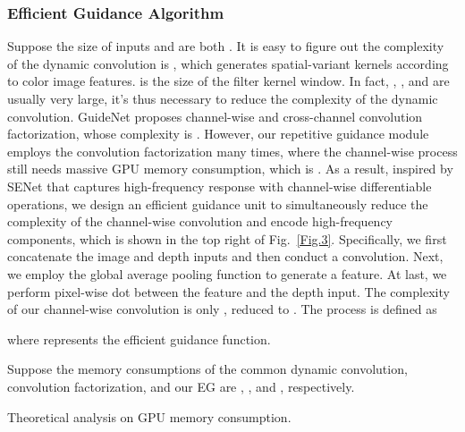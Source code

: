 \documentclass[runningheads]{llncs}
\begin{document}
\subsubsection{Efficient Guidance Algorithm}\label{AG}
Suppose the size of inputs  and  are both . It is easy to figure out the complexity of the dynamic convolution is , which generates spatial-variant kernels according to color image features.  is the size of the filter kernel window. In fact, , , and  are usually very large, it's thus necessary to reduce the complexity of the dynamic convolution. GuideNet \cite{tang2020learning} proposes channel-wise and cross-channel convolution factorization, whose complexity is . However, our repetitive guidance module employs the convolution factorization many times, where the channel-wise process still needs massive GPU memory consumption, which is . As a result, inspired by SENet \cite{hu2018squeeze} that captures high-frequency response with channel-wise differentiable operations, we design an efficient guidance unit to simultaneously reduce the complexity of the channel-wise convolution and encode high-frequency components, which is shown in the top right of Fig.~\ref{Fig.3}. Specifically, we first concatenate the image and depth inputs and then conduct a  convolution. Next, we employ the global average pooling function to generate a  feature. At last, we perform pixel-wise dot between the feature and the depth input. The complexity of our channel-wise convolution is only , reduced to . The process is defined as

where  represents the efficient guidance function. 


Suppose the memory consumptions of the common dynamic convolution, convolution factorization, and our EG are , , and , respectively.

\begin{table}[t]
\centering
\begin{minipage}{0.48\linewidth}
\Large
{}
\caption{Theoretical analysis on GPU memory consumption.}\label{memory_ratio}
\end{minipage}
\begin{minipage}{0.48\linewidth}  
\tiny
{}
\caption{Numerical analysis on GPU memory consumption.}\label{t1}
\end{minipage}
\end{table}
\end{document}
